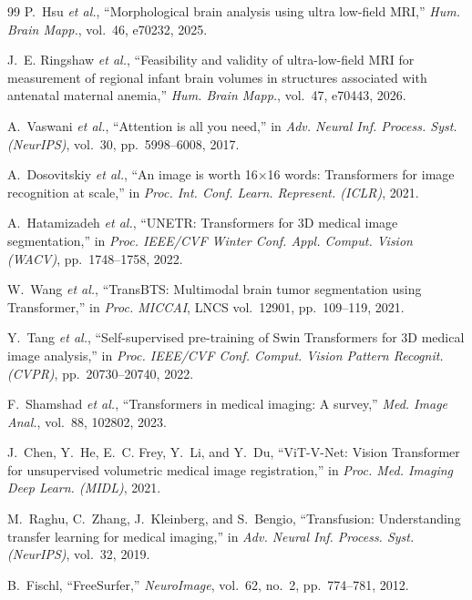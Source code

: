 \begin{thebibliography}{99}
P.~Hsu \textit{et al.},
``Morphological brain analysis using ultra low-field MRI,''
\textit{Hum. Brain Mapp.}, vol.~46, e70232, 2025.

J.~E. Ringshaw \textit{et al.},
``Feasibility and validity of ultra-low-field MRI for measurement of regional infant brain volumes in structures associated with antenatal maternal anemia,''
\textit{Hum. Brain Mapp.}, vol.~47, e70443, 2026.

A.~Vaswani \textit{et al.},
``Attention is all you need,''
in \textit{Adv. Neural Inf. Process. Syst. (NeurIPS)}, vol.~30, pp.~5998--6008, 2017.

A.~Dosovitskiy \textit{et al.},
``An image is worth 16$\times$16 words: Transformers for image recognition at scale,''
in \textit{Proc. Int. Conf. Learn. Represent. (ICLR)}, 2021.

A.~Hatamizadeh \textit{et al.},
``UNETR: Transformers for 3D medical image segmentation,''
in \textit{Proc. IEEE/CVF Winter Conf. Appl. Comput. Vision (WACV)}, pp.~1748--1758, 2022.

W.~Wang \textit{et al.},
``TransBTS: Multimodal brain tumor segmentation using Transformer,''
in \textit{Proc. MICCAI}, LNCS vol.~12901, pp.~109--119, 2021.

Y.~Tang \textit{et al.},
``Self-supervised pre-training of Swin Transformers for 3D medical image analysis,''
in \textit{Proc. IEEE/CVF Conf. Comput. Vision Pattern Recognit. (CVPR)}, pp.~20730--20740, 2022.

F.~Shamshad \textit{et al.},
``Transformers in medical imaging: A survey,''
\textit{Med. Image Anal.}, vol.~88, 102802, 2023.

J.~Chen, Y.~He, E.~C. Frey, Y.~Li, and Y.~Du,
``ViT-V-Net: Vision Transformer for unsupervised volumetric medical image registration,''
in \textit{Proc. Med. Imaging Deep Learn. (MIDL)}, 2021.

M.~Raghu, C.~Zhang, J.~Kleinberg, and S.~Bengio,
``Transfusion: Understanding transfer learning for medical imaging,''
in \textit{Adv. Neural Inf. Process. Syst. (NeurIPS)}, vol.~32, 2019.

B.~Fischl,
``FreeSurfer,''
\textit{NeuroImage}, vol.~62, no.~2, pp.~774--781, 2012.


\end{thebibliography}
